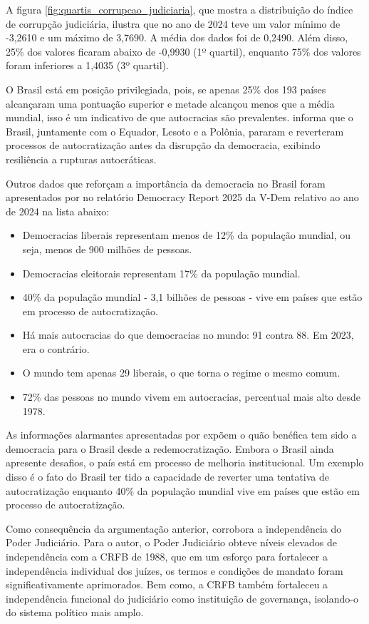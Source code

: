 A figura \ref{fig:quartis_corrupcao_judiciaria}, que mostra a distribuição do índice de corrupção judiciária, ilustra que no ano de 2024 teve um valor mínimo de -3,2610 e um máximo de 3,7690. A média dos dados foi de 0,2490. Além disso, 25\% dos valores ficaram abaixo de -0,9930 (1º quartil), enquanto 75\% dos valores foram inferiores a 1,4035 (3º quartil).

O Brasil está em posição privilegiada, pois, se apenas 25\% dos 193 países alcançaram uma pontuação superior e metade alcançou menos que a média mundial, isso é um indicativo de que autocracias são prevalentes. \cite{nord2025democracy} informa que o Brasil, juntamente com o Equador, Lesoto e a Polônia, pararam e reverteram processos de autocratização antes da disrupção da democracia, exibindo resiliência a rupturas autocráticas.

Outros dados que reforçam a importância da democracia no Brasil foram apresentados por \cite{nord2025democracy} no relatório Democracy Report 2025 da V-Dem relativo ao ano de 2024 na lista abaixo:

\begin{itemize}
    \item Democracias liberais representam menos de 12\% da população mundial, ou seja, menos de 900 milhões de pessoas.
    \item Democracias eleitorais representam 17\% da população mundial.
    \item 40\%  da população mundial - 3,1 bilhões de pessoas - vive em países que estão em processo de autocratização.
    \item Há mais autocracias do que democracias no mundo: 91 contra 88. Em 2023, era o contrário.
    \item O mundo tem apenas 29 liberais, o que torna o regime o mesmo comum.
    \item 72\% das pessoas no mundo vivem em autocracias, percentual mais alto desde 1978.
\end{itemize}

As informações alarmantes apresentadas por \cite{nord2025democracy} expõem o quão benéfica tem sido a democracia para o Brasil desde a redemocratização. Embora o Brasil ainda apresente desafios, o país está em processo de melhoria institucional. Um exemplo disso é o fato do Brasil ter tido a capacidade de reverter uma tentativa de autocratização enquanto 40\%  da população mundial vive em países que estão em processo de autocratização.

Como consequência da argumentação anterior, \cite{pires2021paradoxo} corrobora a independência do Poder Judiciário. Para o autor, o Poder Judiciário obteve níveis elevados de independência com a CRFB de 1988, que em um esforço para fortalecer a independência individual dos juízes, os termos e condições de mandato foram significativamente aprimorados.  Bem como, a CRFB também fortaleceu a independência funcional do judiciário como instituição de governança, isolando-o do sistema político mais amplo.

